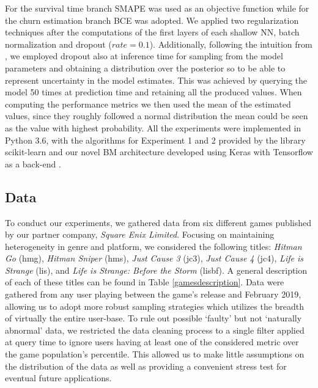 For the survival time branch SMAPE was used as an objective function while for the churn estimation branch BCE was adopted. We applied two regularization techniques after the computations of the first layers of each shallow NN, batch normalization \cite{ioffe2015batch} and dropout \cite{srivastava2014dropout} ($rate = 0.1$). Additionally, following the intuition from \cite{gal2016dropout}, we employed dropout also at inference time for sampling from the model parameters and obtaining a distribution over the posterior so to be able to represent uncertainty in the model estimates. This was achieved by querying the model 50 times at prediction time and retaining all the produced values. When computing the performance metrics we then used the mean of the estimated values, since they roughly followed a normal distribution the mean could be seen as the value with highest probability. All the experiments were implemented in Python 3.6, with the algorithms for Experiment 1 and 2 provided by the library scikit-learn \cite{scikit-learn} and our novel BM architecture developed using Keras with Tensorflow as a back-end \cite{chollet2015keras}.

\subsection{Data}
To conduct our experiments, we gathered data from six different games published by our partner company, \textit{Square Enix Limited}. Focusing on maintaining heterogeneity in genre and platform, we considered the following titles: \emph{Hitman Go} (hmg), \emph{Hitman Sniper} (hms), \emph{Just Cause 3} (jc3), \emph{Just Cause 4} (jc4), \emph{Life is Strange} (lis), and \emph{Life is Strange: Before the Storm} (lisbf). A general description of each of these titles can be found in Table \ref{gamesdescription}. Data were gathered from any user playing between the game's release and February 2019, allowing us to adopt more robust sampling strategies which utilizes the breadth of virtually the entire user-base. To rule out possible `faulty' but not `naturally abnormal' data, we restricted the data cleaning process to a single filter applied at query time to ignore users having at least one of the considered metric over the game population's  percentile. This allowed us to make little assumptions on the distribution of the data as well as providing a convenient stress test for eventual future applications.

